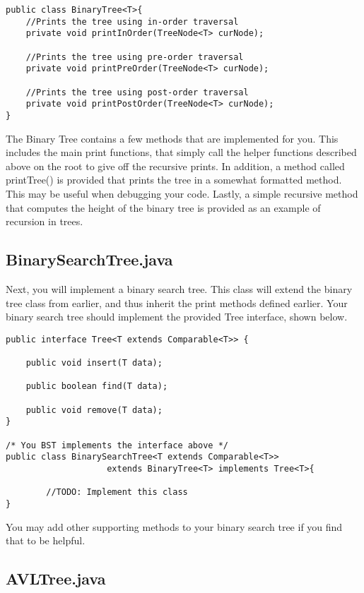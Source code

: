 \documentclass[paper=a4, fontsize=11pt, parskip=full]{scrartcl} %
\numberwithin{equation}{section} %
\numberwithin{figure}{section} %
\numberwithin{table}{section} %
\begin{document}
\begin{lstlisting}
public class BinaryTree<T>{
	//Prints the tree using in-order traversal
	private void printInOrder(TreeNode<T> curNode);
	
	//Prints the tree using pre-order traversal
	private void printPreOrder(TreeNode<T> curNode);
	
	//Prints the tree using post-order traversal
	private void printPostOrder(TreeNode<T> curNode);
}
\end{lstlisting}

The Binary Tree contains a few methods that are implemented for you. This includes the main print functions, that simply call the helper functions described above on the root to give off the recursive prints. In addition, a method called printTree() is provided that prints the tree in a somewhat formatted method. This may be useful when debugging your code. Lastly, a simple recursive method that computes the height of the binary tree is provided as an example of recursion in trees.

\subsection{BinarySearchTree.java}

Next, you will implement a binary search tree. This class will extend the binary tree class from earlier, and thus inherit the print methods defined earlier. Your binary search tree should implement the provided Tree interface, shown below. 

\begin{lstlisting}
public interface Tree<T extends Comparable<T>> {
	
	public void insert(T data);
	
	public boolean find(T data);

	public void remove(T data);
}

/* You BST implements the interface above */
public class BinarySearchTree<T extends Comparable<T>>
					extends BinaryTree<T> implements Tree<T>{

		//TODO: Implement this class
}
\end{lstlisting}

You may add other supporting methods to your binary search tree if you find that to be helpful. 

\subsection{AVLTree.java}
\end{document}
